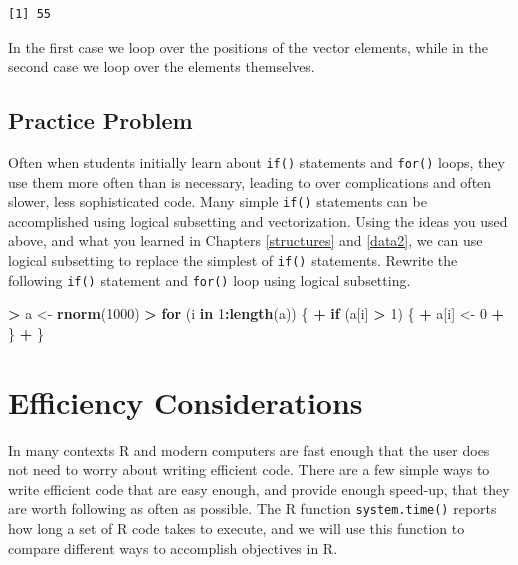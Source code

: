 \documentclass[
]{krantz}
\makeatletter
\newenvironment{Shaded}{\begin{snugshade}}{\end{snugshade}}
\newcommand{\ControlFlowTok}[1]{\textcolor[rgb]{0.27,0.27,0.27}{\textbf{#1}}}
\newcommand{\DecValTok}[1]{\textcolor[rgb]{0.06,0.06,0.06}{#1}}
\newcommand{\KeywordTok}[1]{\textcolor[rgb]{0.27,0.27,0.27}{\textbf{#1}}}
\newcommand{\NormalTok}[1]{#1}
\newcommand{\OperatorTok}[1]{\textcolor[rgb]{0.43,0.43,0.43}{\textbf{#1}}}
\newcommand{\StringTok}[1]{\textcolor[rgb]{0.5,0.5,0.5}{#1}}
\newenvironment{kframe}{%
\medskip{}
\setlength{\fboxsep}{.8em}
 \def\at@end@of@kframe{}%
 \ifinner\ifhmode%
  \def\at@end@of@kframe{\end{minipage}}%
  \begin{minipage}{\columnwidth}%
 \fi\fi%
 \def\FrameCommand##1{\hskip\@totalleftmargin \hskip-\fboxsep
 \colorbox{shadecolor}{##1}\hskip-\fboxsep
     \hskip-\linewidth \hskip-\@totalleftmargin \hskip\columnwidth}%
 \MakeFramed {\advance\hsize-\width
   \@totalleftmargin\z@ \linewidth\hsize
   \@setminipage}}%
 {\par\unskip\endMakeFramed%
 \at@end@of@kframe}
\renewenvironment{Shaded}{\begin{kframe}}{\end{kframe}}
\makeatother
\begin{document}
\begin{verbatim}
[1] 55
\end{verbatim}

In the first case we loop over the positions of the vector elements, while in the second case we loop over the elements themselves.

\hypertarget{practice-problem-12}{%
\subsection{Practice Problem}\label{practice-problem-12}}

Often when students initially learn about \texttt{if()} statements and \texttt{for()} loops, they use them more often than is necessary, leading to over complications and often slower, less sophisticated code. Many simple \texttt{if()} statements can be accomplished using logical subsetting and vectorization. Using the ideas you used above, and what you learned in Chapters \ref{structures} and \ref{data2}, we can use logical subsetting to replace the simplest of \texttt{if()} statements. Rewrite the following \texttt{if()} statement and \texttt{for()} loop using logical subsetting.

\begin{Shaded}
\begin{Highlighting}[]
\OperatorTok{\textgreater{}}\StringTok{ }\NormalTok{a \textless{}{-}}\StringTok{ }\KeywordTok{rnorm}\NormalTok{(}\DecValTok{1000}\NormalTok{)}
\OperatorTok{\textgreater{}}\StringTok{ }\ControlFlowTok{for}\NormalTok{ (i }\ControlFlowTok{in} \DecValTok{1}\OperatorTok{:}\KeywordTok{length}\NormalTok{(a)) \{}
\OperatorTok{+}\StringTok{   }\ControlFlowTok{if}\NormalTok{ (a[i] }\OperatorTok{\textgreater{}}\StringTok{ }\DecValTok{1}\NormalTok{) \{}
\OperatorTok{+}\StringTok{     }\NormalTok{a[i] \textless{}{-}}\StringTok{ }\DecValTok{0}
\OperatorTok{+}\StringTok{   }\NormalTok{\}}
\OperatorTok{+}\StringTok{ }\NormalTok{\}}
\end{Highlighting}
\end{Shaded}

\hypertarget{efficiency-considerations}{%
\section{Efficiency Considerations}\label{efficiency-considerations}}

In many contexts R and modern computers are fast enough that the user does not need to worry about writing efficient code. There are a few simple ways to write efficient code that are easy enough, and provide enough speed-up, that they are worth following as often as possible. The R function \texttt{system.time()} reports how long a set of R code takes to execute, and we will use this function to compare different ways to accomplish objectives in R.
\end{document}
